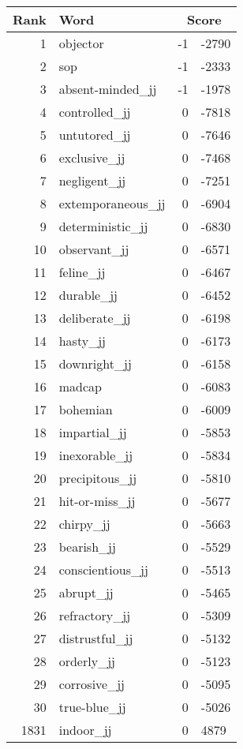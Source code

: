 \begin{longtable}[!htbp]{| rlr@{.}l |}
    \hline
    \textbf{Rank} & \textbf{Word} & \multicolumn{2}{c|}{\textbf{Score}} \\
    \hline
    \endhead
    1 & objector & -1 & -2790 \\
    2 & sop & -1 & -2333 \\
    3 & absent-minded\_jj & -1 & -1978 \\
    4 & controlled\_jj & 0 & -7818 \\
    5 & untutored\_jj & 0 & -7646 \\
    6 & exclusive\_jj & 0 & -7468 \\
    7 & negligent\_jj & 0 & -7251 \\
    8 & extemporaneous\_jj & 0 & -6904 \\
    9 & deterministic\_jj & 0 & -6830 \\
    10 & observant\_jj & 0 & -6571 \\
    11 & feline\_jj & 0 & -6467 \\
    12 & durable\_jj & 0 & -6452 \\
    13 & deliberate\_jj & 0 & -6198 \\
    14 & hasty\_jj & 0 & -6173 \\
    15 & downright\_jj & 0 & -6158 \\
    16 & madcap & 0 & -6083 \\
    17 & bohemian & 0 & -6009 \\
    18 & impartial\_jj & 0 & -5853 \\
    19 & inexorable\_jj & 0 & -5834 \\
    20 & precipitous\_jj & 0 & -5810 \\
    21 & hit-or-miss\_jj & 0 & -5677 \\
    22 & chirpy\_jj & 0 & -5663 \\
    23 & bearish\_jj & 0 & -5529 \\
    24 & conscientious\_jj & 0 & -5513 \\
    25 & abrupt\_jj & 0 & -5465 \\
    26 & refractory\_jj & 0 & -5309 \\
    27 & distrustful\_jj & 0 & -5132 \\
    28 & orderly\_jj & 0 & -5123 \\
    29 & corrosive\_jj & 0 & -5095 \\
    30 & true-blue\_jj & 0 & -5026 \\
    1831 & indoor\_jj & 0 & 4879 \\

\end{longtable}
